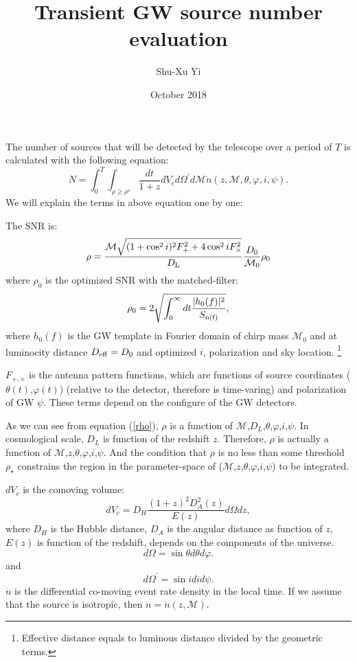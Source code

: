 \documentclass[fleqn,usenatbib]{mnras}
\title{Transient GW source number evaluation}
\author{Shu-Xu Yi}
\date{October 2018}
\begin{document}
\maketitle
The number of sources that will be detected by the telescope over a period of $T$ is calculated with the following equation:
\begin{equation}
    N=\int^T_0\int_{\rho\ge\rho^\star}\frac{dt}{1+z}dV_cd\Omega^\prime d\mathcal{M}\dot{n}(z,\mathcal{M},\theta,\varphi,i,\psi).
\end{equation}
We will explain the terms in above equation one by one:

The SNR is:
\begin{equation}
    \rho=\frac{\mathcal{M}{\sqrt{(1+\cos^2i)^2F^2_++4\cos^2i F^2_\times}}}{D_{\rm{L}}}\frac{D_0}{\mathcal{M}_0}\rho_0
    \label{rho}
\end{equation}
where $\rho_0$ is the optimized SNR with the matched-filter:
\begin{equation}
    \rho_0=2\sqrt{\int^\infty_0dt\frac{|h_0(f)|^2}{S_{\rm{n}(f)}}},
\end{equation}
where $h_0(f)$ is the GW template in Fourier domain of chirp mass $\mathcal{M}_0$ and at luminocity distance $D_{\rm{eff}}=D_0$ and optimized $i$, polarization and sky location. \footnote{Effective distance equals to luminous distance divided by the geometric terms.}

$F_{+,\times}$ is the antenna pattern functions, which are functions of source coordinates ($\theta(t)$,$\varphi(t)$) (relative to the detector, therefore is time-varing) and polarization of GW $\psi$. These terms depend on the configure of the GW detectors. 

As we can see from equation (\ref{rho}), $\rho$ is a function of $\mathcal{M}$,$D_L$,$\theta$,$\varphi$,$i$,$\psi$. In cosmological scale, $D_L$ is function of the redshift $z$. Therefore, $\rho$ is actually a function of $\mathcal{M}$,$z$,$\theta$,$\varphi$,$i$,$\psi$. And the condition that $\rho$ is no less than some threshold $\rho_\star$ constrains the region in the parameter-space of ($\mathcal{M}$,$z$,$\theta$,$\varphi$,$i$,$\psi$) to be integrated. 

$dV_c$ is the comoving volume:
\begin{equation}
    dV_c=D_H\frac{(1+z)^2D^2_A(z)}{E(z)}d\Omega dz,
\end{equation}
where 
$D_H$ is the Hubble distance, $D_A$ is the angular distance as function of $z$, $E(z)$ is function of the redshift, depends on the components of the universe. 
\begin{equation}
    d\Omega=\sin\theta d\theta d\varphi. 
\end{equation}
and 
\begin{equation}
    d\Omega^\prime=\sin idid\psi. 
\end{equation}
$\dot{n}$ is the differential co-moving event rate density in the local time. If we assume that the source is isotropic, then $\dot{n}=\dot{n}(z,\mathcal{M})$. 
\end{document}
